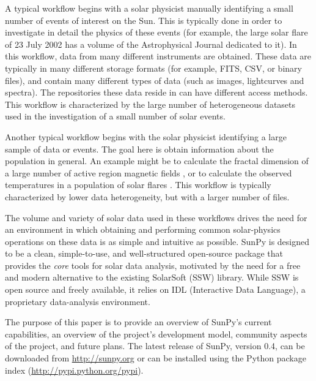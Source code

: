 A typical workflow begins with a solar physicist manually identifying
a small number of events of interest on the Sun.  This is typically
done in order to investigate in detail the physics of these events
(for example, the large solar flare of 23 July 2002 has a volume of
the Astrophysical Journal dedicated to it).  In this workflow, data
from many different instruments are obtained.  These data are
typically in many different storage formats (for example, FITS, CSV,
or binary files), and contain many different types of data (such as
images, lightcurves and spectra).  The repositories these data reside
in can have different access methods.  This workflow is characterized
by the large number of heterogeneous datasets used in the
investigation of a small number of solar events.

Another typical workflow begins with the solar physicist identifying a
large sample of data or events.  The goal here is obtain information
about the population in general.  An example might be to calculate the
fractal dimension of a large number of active region magnetic fields
\cite{2005ApJ...631..628M}, or to calculate the observed temperatures
in a population of solar flares \cite{2012ApJS..202...11R}.  This
workflow is typically characterized by lower data heterogeneity, but
with a larger number of files.

The volume and variety of solar data used in these workflows drives
the need for an environment in which obtaining and performing common
solar-physics operations on these data is as simple and intuitive as
possible.  SunPy is designed to be a clean, simple-to-use, and
well-structured open-source package that provides the \textit{core}
tools for solar data analysis, motivated by the need for a free and
modern alternative to the existing SolarSoft (SSW) library. While SSW
is open source and freely available, it relies on IDL (Interactive
Data Language), a proprietary data-analysis environment.

The purpose of this paper is to provide an overview of SunPy's current
capabilities, an overview of the project's development model, community aspects of the
project, and future plans. The latest release of SunPy, version 0.4,
can be downloaded from \url{http://sunpy.org} or can be
installed using the Python package index (\url{http://pypi.python.org/pypi}).

